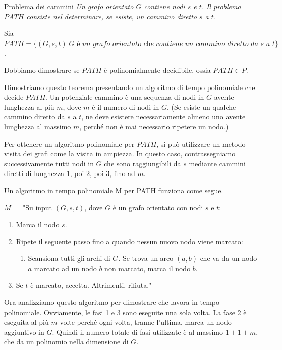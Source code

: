 \begin{Example}{Problema dei cammini}{}
\textit{Un grafo orientato $G$ contiene nodi $s$ e $t$. Il problema $PATH$ consiste nel determinare, se esiste, un cammino diretto $s$ a $t$.}

Sia $PATH =\{(G,s,t)| G\textit{ è un grafo orientato che contiene un cammino diretto da }s\textit{ a }t\}$.

Dobbiamo dimostrare se $PATH$ è polinomialmente decidibile, ossia $PATH\in P$.
\begin{osservation}
Dimostriamo questo teorema presentando un algoritmo di tempo polinomiale che decide $PATH$. Un potenziale cammino è una sequenza di nodi in $G$ avente lunghezza al più $m$, dove $m$ è il numero di nodi in $G$. (Se esiste un qualche cammino diretto da $s$ a $t$, ne deve esistere necessariamente almeno uno avente lunghezza al massimo $m$, perché non è mai necessario ripetere un nodo.)

Per ottenere un algoritmo polinomiale per $PATH$, si può utilizzare un metodo visita dei grafi come la visita in ampiezza. In questo caso, contrassegniamo successivamente tutti nodi in $G$ che sono raggiungibili da $s$ mediante cammini diretti di lunghezza 1, poi 2, poi 3, fino ad $m$.    
\end{osservation}
\begin{demonstration}
Un algoritmo in tempo polinomiale M per PATH funziona come segue.

$M=$ "Su input $(G, s,t)$, dove $G$ è un grafo orientato con nodi $s$ e $t$:
\begin{enumerate}
    \item Marca il nodo $s$.
    \item Ripete il seguente passo fino a quando nessun nuovo nodo viene marcato:
    \begin{enumerate}
        \item Scansiona tutti gli archi di $G$. Se trova un arco $(a, b)$ che va da un nodo $a$ marcato ad un nodo $b$ non marcato, marca il nodo $b$.
    \end{enumerate}
    \item Se $t$ è marcato, accetta. Altrimenti, rifiuta."
\end{enumerate}
Ora analizziamo questo algoritmo per dimostrare che lavora in tempo polinomiale. Ovviamente, le fasi 1 e 3 sono eseguite una sola volta. La fase 2 è eseguita al più $m$ volte perché ogni volta, tranne l'ultima, marca un nodo aggiuntivo in $G$. Quindi il numero totale di fasi utilizzate è al massimo $1+1+m$, che da un polinomio nella dimensione di $G$.    
\end{demonstration}
\end{Example}


